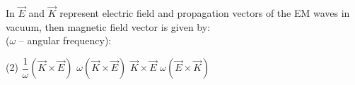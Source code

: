 \item In $\vec{E}$ and $\vec{K}$ represent electric field and propagation vectors of the EM waves in vacuum, then magnetic field vector is given by:\\ 
($\omega$ -- angular frequency):
    \begin{tasks}(2)
        \task $\dfrac{1}{\omega} (\vec{K} \times \vec{E})$
        \task $\omega (\vec{K} \times \vec{E})$
        \task $\vec{K} \times \vec{E}$
        \task $\omega (\vec{E} \times \vec{K})$
    \end{tasks}